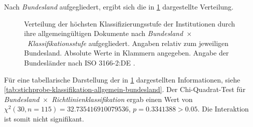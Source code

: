 Nach \textit{Bundesland} aufgegliedert, ergibt sich die in \cref{fig:policy-klassifikation-allgemein-absolut} dargestellte Verteilung.
\begin{figure}[!htbp]
    \centering
    \resizebox{\textwidth}{!}{}
    \caption{Verteilung der höchsten Klassifizierungsstufe der Institutionen durch ihre allgemeingültigen Dokumente nach \textit{Bundesland}~$\times$~\textit{Klassifikationsstufe} aufgegliedert.
    Angaben relativ zum jeweiligen Bundesland.
    Absolute Werte in Klammern angegeben.
    Angabe der Bundesländer nach ISO 3166-2:DE \autocite{ISO3166}.}
    \label{fig:policy-klassifikation-allgemein-absolut}
\end{figure}
Für eine tabellarische Darstellung der in \cref{fig:policy-klassifikation-allgemein-absolut} dargestellten Informationen, siehe \cref{tab:stichprobe-klassifikation-allgemein-bundesland}.
Der Chi-Quadrat-Test für \textit{Bundesland}~$\times$~\textit{Richtlinienklassifikation} ergab einen Wert von $\chi^2 (\num{30}, n=\num{115}) = \num[round-mode=places,round-precision=2]{32,735416910079536}$, $p = \num{0,3341388}>\num{0.05}$.
Die Interaktion ist somit nicht signifikant.

